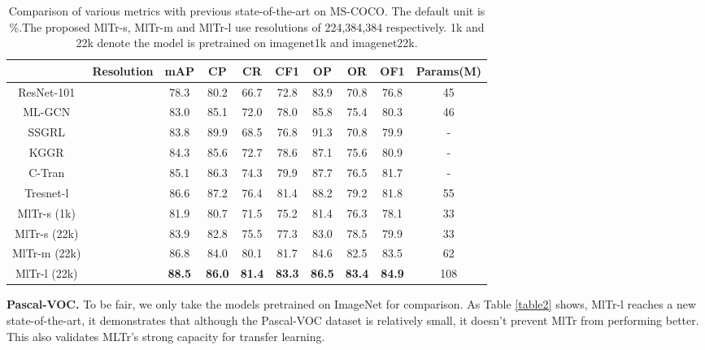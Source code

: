 \documentclass{article} \usepackage[numbers,sort&compress]{natbib}
\begin{document}
\begin{table*}
\caption{Comparison of various metrics with previous state-of-the-art on MS-COCO. The default unit is \%.The proposed MlTr-s, MlTr-m and MlTr-l use resolutions of 224,384,384 respectively. 1k and 22k denote the model is pretrained on imagenet1k and imagenet22k.}
\label{table1}
\centering
\begin{tabular}{|c||c|c|c|c|c|c|c|c|c|}
\hline
\  & Resolution &mAP & CP & CR & CF1 & OP & OR & OF1 &Params(M) \\
\hline
\hline
ResNet-101 \cite{he2016deep} & &78.3 &80.2 &66.7 &72.8  &83.9 &70.8 &76.8 &45\\
ML-GCN \cite{chen2019multi} & &83.0 &85.1 &72.0 &78.0 &85.8 &75.4 &80.3   &46\\
SSGRL \cite{chen2019learning}  & &83.8 &89.9 &68.5 &76.8 &91.3 &70.8 &79.9   &-\\
KGGR \cite{chen2020knowledge}   & &84.3 &85.6 &72.7 &78.6 &87.1 &75.6 &80.9   &-\\
C-Tran \cite{lanchantin2020general} & &85.1 &86.3 &74.3 &79.9 &87.7 &76.5 &81.7   &-\\
Tresnet-l \cite{ben2020asymmetric} & &86.6 &87.2 &76.4 &81.4 &88.2 &79.2 &81.8  &55\\
\hline
\hline
MlTr-s (1k) & &81.9 &80.7 &71.5 &75.2 &81.4 &76.3 &78.1   &33\\
MlTr-s (22k) & &83.9 &82.8 &75.5 &77.3 &83.0 &78.5 &79.9 &33\\
MlTr-m (22k)& &86.8 &84.0 &80.1 &81.7 &84.6 &82.5 &83.5   &62\\
MlTr-l (22k)& &\textbf{88.5} &\textbf{86.0} &\textbf{81.4} &\textbf{83.3} &\textbf{86.5} &\textbf{83.4} &\textbf{84.9}   &108\\
\hline
\end{tabular}
\end{table*}

\textbf{Pascal-VOC.}
To be fair, we only take the models pretrained on ImageNet for comparison. As Table \textcolor{red}{\ref{table2}} shows, MlTr-l reaches a new state-of-the-art, it demonstrates that although the Pascal-VOC dataset is relatively small, it doesn't prevent MlTr from performing better. This also validates MLTr's strong capacity for transfer learning. 
\end{document}
